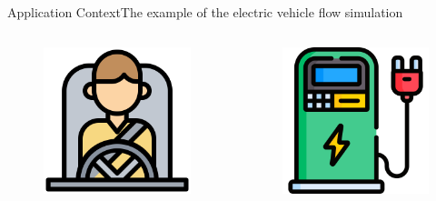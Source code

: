 \begin{frame}{Application Context}{The example of the electric vehicle flow simulation}
\begin{columns}
\begin{column}{.48\linewidth}
\begin{figure}
	\includegraphics[width=.7\textwidth]{figures/driver.png}
\end{figure}
\end{column}
\begin{column}{.48\linewidth}
\begin{figure}
	\includegraphics[width=.7\textwidth]{figures/electric-charge.png}
\end{figure}
\end{column}
\end{columns}
\end{frame}


